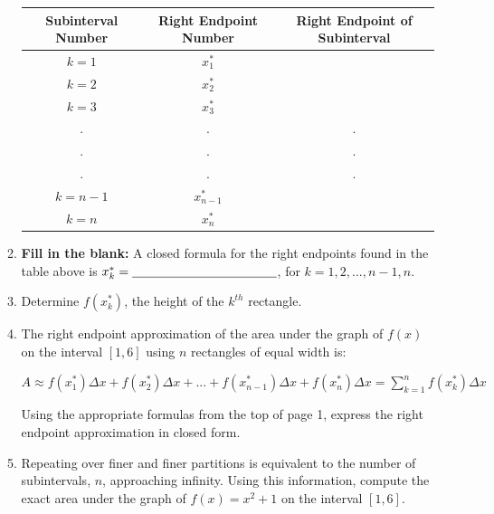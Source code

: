 \documentclass[12pt]{article}
\newif\ifans
\begin{document}
\begin{enumerate}
\begin{enumerate}
\begin{center}
\begin{tabular}{c|c|c}
Subinterval Number & Right Endpoint Number & Right Endpoint of Subinterval\\
\hline
$k=1$ & $x_1^*$ & \ifans{\fbox{$1+\frac{5}{n}$}} \fi\\
\hline
$k=2$ & $x_2^*$ & \ifans{\fbox{$1+\frac{5}{n}(2)$}} \fi\\
\hline
$k=3$ & $x_3^*$ & \ifans{\fbox{$1+\frac{5}{n}(3)$}} \fi \\
\hline
. & . & .\\
. & . & .\\ 
. & . & .\\
\hline
$k=n-1$ & $x_{n-1}^*$ & \ifans{\fbox{$1+\frac{5}{n}(n-1)$}} \fi\\
\hline
$k=n$ & $x_{n}^*$ & \ifans{\fbox{$1+\frac{5}{n}(n)=6$}} \fi\\
\end{tabular}
\end{center}

\item {\bf Fill in the blank:} A closed formula for the right endpoints found in the table above is $x_k^*=\underline{\hspace{2 cm} \ifans{\fbox{$1+\frac{5}{n}(k)$}} \fi \hspace{2cm}}$, for $k=1,2,...,n-1,n$.

\item Determine $f(x_k^*)$, the height of the $k^{th}$ rectangle.

\ifans{\fbox{$\left(1+\frac{5}{n}k\right)^2+1$}} \fi

\item The right endpoint approximation of the area under the graph of $f(x)$ on the interval $[1,6]$ using $n$ rectangles of equal width is:\\

\begin{center}
$A \approx f(x_1^*)\Delta x+f(x_2^*)\Delta x+...+f(x_{n-1}^*)\Delta x+f(x_n^*)\Delta x=\sum_{k=1}^n{f(x_k^*)\Delta x}$
\end{center}

Using the appropriate formulas from the top of page 1, express the right endpoint approximation in closed form.

\ifans{\fbox{$\sum_{k=1}^n{f(x_k^*)\Delta x}=\sum_{k=1}^n\left[\left(1+\frac{5}{n}k\right)^2+1\right]\frac{5}{n}=10+\frac{25(n+1)}{n}+\frac{125(n+1)(2n+1)}{6n^2}$}} \fi

\item Repeating over finer and finer partitions is equivalent to the number of subintervals, $n$, approaching infinity.  Using this information, compute the exact area under the graph of $f(x)=x^2+1$ on the interval $[1,6]$.


\end{enumerate}
\end{enumerate}
\end{document}
